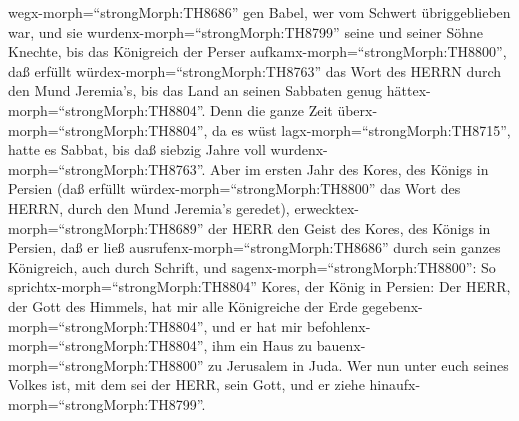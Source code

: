 wegx-morph=``strongMorph:TH8686'' gen Babel, wer vom Schwert
übriggeblieben war, und sie wurdenx-morph=``strongMorph:TH8799'' seine
und seiner Söhne Knechte, bis das Königreich der Perser
aufkamx-morph=``strongMorph:TH8800'',  daß erfüllt
würdex-morph=``strongMorph:TH8763'' das Wort des HERRN durch den Mund
Jeremia's, bis das Land an seinen Sabbaten genug
hättex-morph=``strongMorph:TH8804''. Denn die ganze Zeit
überx-morph=``strongMorph:TH8804'', da es wüst
lagx-morph=``strongMorph:TH8715'', hatte es Sabbat, bis daß siebzig
Jahre voll wurdenx-morph=``strongMorph:TH8763''.  Aber im
ersten Jahr des Kores, des Königs in Persien (daß erfüllt
würdex-morph=``strongMorph:TH8800'' das Wort des HERRN, durch den Mund
Jeremia's geredet), erwecktex-morph=``strongMorph:TH8689'' der HERR den
Geist des Kores, des Königs in Persien, daß er ließ
ausrufenx-morph=``strongMorph:TH8686'' durch sein ganzes Königreich,
auch durch Schrift, und sagenx-morph=``strongMorph:TH8800'':
 So sprichtx-morph=``strongMorph:TH8804'' Kores, der König
in Persien: Der HERR, der Gott des Himmels, hat mir alle Königreiche der
Erde gegebenx-morph=``strongMorph:TH8804'', und er hat mir
befohlenx-morph=``strongMorph:TH8804'', ihm ein Haus zu
bauenx-morph=``strongMorph:TH8800'' zu Jerusalem in Juda. Wer nun unter
euch seines Volkes ist, mit dem sei der HERR, sein Gott, und er ziehe
hinaufx-morph=``strongMorph:TH8799''.
